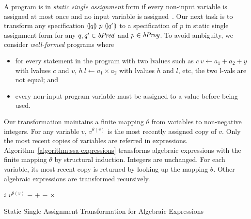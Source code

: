 
A program is in \emph{static single assignment} form if every non-input variable
is assigned at most once and no input variable is assigned~\cite{AWZ:88:DQVP}.
Our next task is to transform any specification
${(\!|}{q}{|\!)}~{p}~{(\!|}{q'}{|\!)}$ to a specification of $p$ in
static single  assignment form for any $q, q' \in \mathit{bPred}$ and $p \in
\mathit{bProg}$.
To avoid ambiguity, we consider \emph{well-formed} programs where
\begin{itemize}
\item for every statement in the program with two lvalues such as $c\ v \leftarrow a_1 + a_2 + y$ with lvalues $c$ and $v$, $h\ l \leftarrow a_1 \times a_2$ with lvalues $h$ and $l$, etc, the two l-vals are not equal; and
\item every non-input program variable must be assigned to a value
  before being used.
\end{itemize}

Our transformation maintains a finite mapping $\theta$ from variables to
non-negative integers. For any variable $v$, $v^{\theta(v)}$ is
the most recently assigned copy of $v$. Only the most recent copies of
variables are referred in
expressions. Algorithm~\ref{algorithm:ssa-expressions}
transforms algebraic expressions with the finite mapping $\theta$ by
structural induction. Integers are unchanged. For each variable, its
most recent copy is returned by looking up the mapping $\theta$. Other
algebraic expressions are transformed recursively.

\begin{algorithm}
  \begin{algorithmic}[1]
       \Return $i$ \EndCase
       \Return $v^{\theta(v)}$ \EndCase
       \Return $-$ \EndCase
        \Return {} $+$
      \EndCase
        \Return {} $-$
      \EndCase
        \Return {} $\times$
      \EndCase
    \EndMatch
    \EndFunction
  \end{algorithmic}
  \caption{Static Single Assignment Transformation for Algebraic Expressions}
  \label{algorithm:ssa-expressions}
\end{algorithm}

